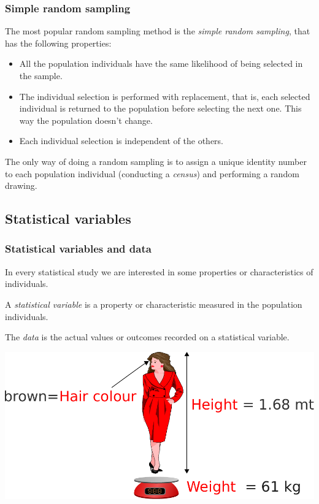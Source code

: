 \begin{frame}
\frametitle{Simple random sampling}
The most popular random sampling method is the \emph{simple random sampling}, that has the following properties:
\begin{itemize}
\item All the population individuals have the same likelihood of being selected in the sample. 
\item The individual selection is performed with replacement, that is, each selected individual is returned to the
population before selecting the next one. 
This way the population doesn't change. 
\item Each individual selection is independent of the others. 
\end{itemize}

The only way of doing a random sampling is to assign a unique identity number to each population individual
(conducting a \emph{census}) and performing a random drawing.
\end{frame}


\subsection{Statistical variables}

\begin{frame}
\frametitle{Statistical variables and data}
In every statistical study we are interested in some properties or characteristics of individuals. 
\begin{definition}
A \emph{statistical variable} is a property or characteristic measured in the population individuals. 

The \emph{data} is the actual values or outcomes recorded on a statistical variable. 
\end{definition}

\begin{center}
\includegraphics[scale=0.5]{img/introduction/statistical_variables.pdf}
\end{center}
\end{frame}


